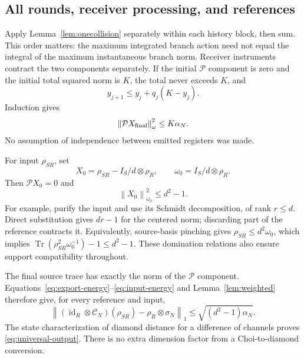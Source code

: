 \documentclass[11pt]{article}
\numberwithin{equation}{section}
\theoremstyle{remark}
\newcommand{\Tr}{\operatorname{Tr}}
\newcommand{\id}{\operatorname{id}}
\newcommand{\Ccal}{\mathcal C}
\newcommand{\Pcal}{\mathcal P}
\newcommand{\norm}[1]{\left\lVert#1\right\rVert}
\begin{document}
\subsection{All rounds, receiver processing, and references}
Apply Lemma~\ref{lem:onecollision} separately within each history block,
then sum. This order matters: the maximum integrated branch action need not
equal the integral of the maximum instantaneous branch norm.
Receiver instruments contract the two components separately. If the initial
\(\Pcal\) component is zero and the initial total squared norm is \(K\), the
total never exceeds \(K\), and
\begin{equation}
 y_{j+1}\le y_j+q_j(K-y_j).
\end{equation}
Induction gives
\begin{equation}
 \norm{\Pcal X_{\rm final}}_\omega^2\le K\alpha_N.
 \label{eq:export-energy}
\end{equation}
No assumption of independence between emitted registers was made.

For input \(\rho_{SR}\), set
\[
 X_0=\rho_{SR}-I_S/d\otimes\rho_R,\qquad
 \omega_0=I_S/d\otimes\rho_R .
\]
Then \(\Pcal X_0=0\) and
\begin{equation}
 \norm{X_0}_{\omega_0}^2\le d^2-1.
 \label{eq:input-energy}
\end{equation}
For example, purify the input and use its Schmidt decomposition, of rank
\(r\le d\). Direct substitution gives \(dr-1\) for the centered norm; discarding
part of the reference contracts it. Equivalently, source-basis pinching
gives \(\rho_{SR}\le d^2\omega_0\), which implies
\(\Tr(\rho_{SR}^2\omega_0^{-1})-1\le d^2-1\).
These domination relations also ensure support compatibility throughout.

The final source trace has exactly the norm of the \(\Pcal\) component.
Equations~\eqref{eq:export-energy}--\eqref{eq:input-energy} and
Lemma~\ref{lem:weighted} therefore give, for every reference and input,
\begin{equation}
 \norm{(\id_R\otimes\Ccal_N)(\rho_{SR})
                     -\rho_R\otimes\sigma_N}_1
 \le\sqrt{(d^2-1)\alpha_N}.
 \label{eq:reference-bound}
\end{equation}
The state characterization of diamond distance for a difference of channels
proves \eqref{eq:universal-output}. There is no extra dimension factor from
a Choi-to-diamond conversion.
\end{document}
